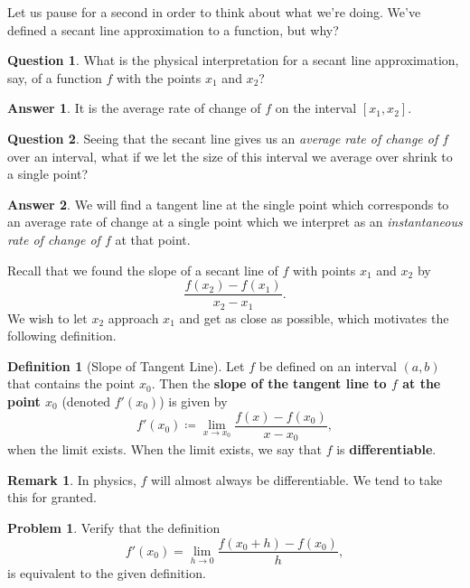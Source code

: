 \documentclass[12pt]{article}
\theoremstyle{definition}
\newtheorem{definition}{Definition}[section]
\newtheorem{remark}{Remark}[section]
\newtheorem{problem}{Problem}[section]
\newtheorem{question}{Question}[section]
\newtheorem{answer}{Answer}[section]
\begin{document}
Let us pause for a second in order to think about what we're doing.  We've defined a secant line approximation to a function, but why?
\begin{question}
What is the physical interpretation for a secant line approximation, say, of a function $f$ with the points $x_1$ and $x_2$?
\end{question}

\begin{answer}
It is the average rate of change of $f$ on the interval $[x_1,x_2]$. 
\end{answer}

\begin{question}
Seeing that the secant line gives us an \emph{average rate of change of $f$} over an interval, what if we let the size of this interval we average over shrink to a single point?
\end{question}

\begin{answer}
We will find a tangent line at the single point which corresponds to an average rate of change at a single point which we interpret as an \emph{instantaneous rate of change of $f$} at that point.
\end{answer}

Recall that we found the slope of a secant line of $f$ with points $x_1$ and $x_2$ by
\[
\frac{f(x_2)-f(x_1)}{x_2-x_1}.
\]
We wish to let $x_2$ approach $x_1$ and get as close as possible, which motivates the following definition.

\begin{definition}[Slope of Tangent Line]
Let $f$ be defined on an interval $(a,b)$ that contains the point $x_0$. Then the \textbf{slope of the tangent line to $f$ at the point $x_0$} (denoted $f'(x_0)$) is given by
\[
f'(x_0)\coloneqq\lim_{x\to x_0} \frac{f(x)-f(x_0)}{x-x_0},
\]
when the limit exists. When the limit exists, we say that $f$ is \textbf{differentiable}.
\end{definition}

\begin{remark}
In physics, $f$ will almost always be differentiable.  We tend to take this for granted.
\end{remark}

\begin{problem}
Verify that the definition
\[
f'(x_0)=\lim_{h\to 0} \frac{f(x_0+h)-f(x_0)}{h},
\]
is equivalent to the given definition.
\end{problem}
\end{document}
